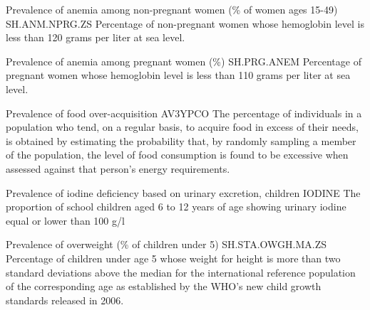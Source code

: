 \begin{MetadataCollection}
\begin{metadata}{ Prevalence of anemia among non-pregnant women (\% of women ages 15-49) }{ SH.ANM.NPRG.ZS }
Percentage of non-pregnant women whose hemoglobin level is less than 120 grams per liter at sea level. 
\end{metadata}

\begin{metadata}{ Prevalence of anemia among pregnant women (\%) }{ SH.PRG.ANEM }
Percentage of pregnant women whose hemoglobin level is less than 110 grams per liter at sea level. 
\end{metadata}

\begin{metadata}{ Prevalence of food over-acquisition }{ AV3YPCO }
The percentage of individuals in a population who tend, on a regular basis, to acquire food in excess of their needs, is obtained by estimating the probability that, by randomly sampling a member of the population, the level of food consumption is found to be excessive when assessed against that person's energy requirements. 
\end{metadata}

\begin{metadata}{ Prevalence of iodine deficiency based on urinary excretion, children   }{ IODINE }
The proportion of school children aged 6 to 12 years of age  showing urinary iodine equal or lower than 100 g/l 
\end{metadata}

\begin{metadata}{ Prevalence of overweight (\% of children under 5) }{ SH.STA.OWGH.MA.ZS }
Percentage of children under age 5 whose weight for height is more than two standard deviations above the median for the international reference population of the corresponding age as established by the WHO's new child growth standards released in 2006. 
\end{metadata}


\end{MetadataCollection}
